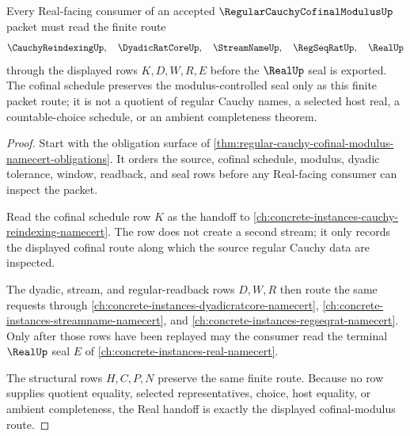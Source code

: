 \begin{theorem}
\label{thm:regular-cauchy-cofinal-modulus-real-handoff}
Every Real-facing consumer of an accepted $\RegularCauchyCofinalModulusUp$ packet must read the finite route
$$
\CauchyReindexingUp,\quad \DyadicRatCoreUp,\quad \StreamNameUp,\quad \RegSeqRatUp,\quad \RealUp
$$
through the displayed rows $K,D,W,R,E$ before the $\RealUp$ seal is exported. The cofinal schedule preserves the modulus-controlled seal only as this finite packet route; it is not a quotient of regular Cauchy names, a selected host real, a countable-choice schedule, or an ambient completeness theorem.
\end{theorem}
\begin{proof}
Start with the obligation surface of \autoref{thm:regular-cauchy-cofinal-modulus-namecert-obligations}. It orders the source, cofinal schedule, modulus, dyadic tolerance, window, readback, and seal rows before any Real-facing consumer can inspect the packet.

Read the cofinal schedule row $K$ as the handoff to \autoref{ch:concrete-instances-cauchy-reindexing-namecert}. The row does not create a second stream; it only records the displayed cofinal route along which the source regular Cauchy data are inspected.

The dyadic, stream, and regular-readback rows $D,W,R$ then route the same requests through \autoref{ch:concrete-instances-dyadicratcore-namecert}, \autoref{ch:concrete-instances-streamname-namecert}, and \autoref{ch:concrete-instances-regseqrat-namecert}. Only after those rows have been replayed may the consumer read the terminal $\RealUp$ seal $E$ of \autoref{ch:concrete-instances-real-namecert}.

The structural rows $H,C,P,N$ preserve the same finite route. Because no row supplies quotient equality, selected representatives, choice, host equality, or ambient completeness, the Real handoff is exactly the displayed cofinal-modulus route.
\end{proof}



